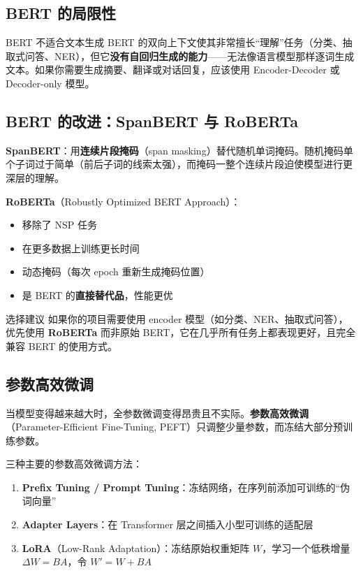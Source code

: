 \documentclass[a4paper]{article}
\begin{document}
\subsection{BERT 的局限性}

\begin{warningbox}{BERT 不适合文本生成}
BERT 的双向上下文使其非常擅长``理解''任务（分类、抽取式问答、NER），但它\textbf{没有自回归生成的能力}——无法像语言模型那样逐词生成文本。如果你需要生成摘要、翻译或对话回复，应该使用 Encoder-Decoder 或 Decoder-only 模型。
\end{warningbox}

\subsection{BERT 的改进：SpanBERT 与 RoBERTa}

\textbf{SpanBERT}：用\textbf{连续片段掩码}（span masking）替代随机单词掩码。随机掩码单个子词过于简单（前后子词的线索太强），而掩码一整个连续片段迫使模型进行更深层的理解。

\textbf{RoBERTa}（Robustly Optimized BERT Approach）：
\begin{itemize}
    \item 移除了 NSP 任务
    \item 在更多数据上训练更长时间
    \item 动态掩码（每次 epoch 重新生成掩码位置）
    \item 是 BERT 的\textbf{直接替代品}，性能更优
\end{itemize}

\begin{knowledgebox}{选择建议}
如果你的项目需要使用 encoder 模型（如分类、NER、抽取式问答），优先使用 \textbf{RoBERTa} 而非原始 BERT，它在几乎所有任务上都表现更好，且完全兼容 BERT 的使用方式。
\end{knowledgebox}

\subsection{参数高效微调}

当模型变得越来越大时，全参数微调变得昂贵且不实际。\textbf{参数高效微调}（Parameter-Efficient Fine-Tuning, PEFT）只调整少量参数，而冻结大部分预训练参数。





三种主要的参数高效微调方法：

\begin{enumerate}
    \item \textbf{Prefix Tuning / Prompt Tuning}：冻结网络，在序列前添加可训练的``伪词向量''
    \item \textbf{Adapter Layers}：在 Transformer 层之间插入小型可训练的适配层
    \item \textbf{LoRA}（Low-Rank Adaptation）：冻结原始权重矩阵 $W$，学习一个低秩增量 $\Delta W = BA$，令 $W' = W + BA$
\end{enumerate}
\end{document}
